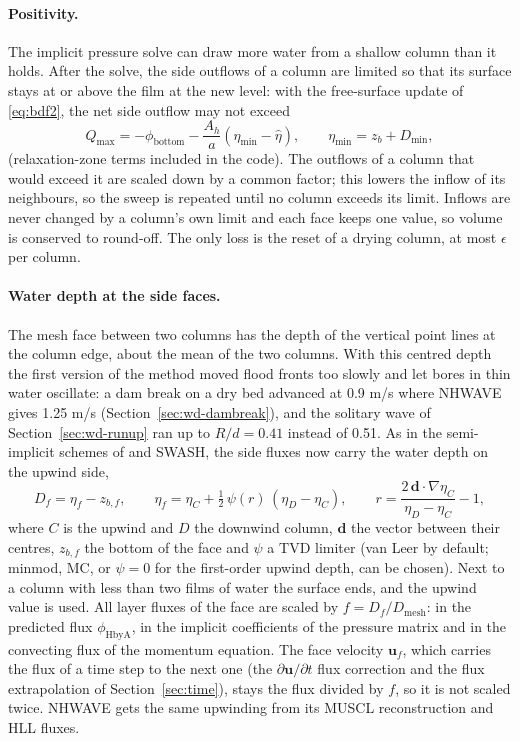 \paragraph{Positivity.} The implicit pressure solve can draw more water from
a shallow column than it holds. After the solve, the side outflows of a column
are limited so that its surface stays at or above the film at the new level:
with the free-surface update of \eqref{eq:bdf2}, the net side outflow may not
exceed
\begin{equation}
  Q_{\max} = -\phi_{\mathrm{bottom}} - \frac{A_h}{a}\left(\eta_{\min} - \hat\eta\right),
  \qquad \eta_{\min} = z_b + D_{\min},
\end{equation}
(relaxation-zone terms included in the code). The outflows of a column that
would exceed it are scaled down by a common factor; this lowers the inflow of
its neighbours, so the sweep is repeated until no column exceeds its limit.
Inflows are never changed by a column's own limit and each face keeps one
value, so volume is conserved to round-off. The only loss is the reset of a
drying column, at most $\epsilon$ per column.

\paragraph{Water depth at the side faces.} The mesh face between two columns
has the depth of the vertical point lines at the column edge, about the mean
of the two columns. With this centred depth the first version of the method
moved flood fronts too slowly and let bores in thin water oscillate: a dam
break on a dry bed advanced at 0.9 m/s where NHWAVE gives 1.25 m/s
(Section~\ref{sec:wd-dambreak}), and the solitary wave of
Section~\ref{sec:wd-runup} ran up to $R/d = 0.41$ instead of 0.51. As in the
semi-implicit schemes of \citet{stelling2003b} and SWASH, the side fluxes now
carry the water depth on the upwind side,
\begin{equation}
  D_f = \eta_f - z_{b,f},\qquad
  \eta_f = \eta_C + \tfrac12\,\psi(r)\,(\eta_D - \eta_C),\qquad
  r = \frac{2\,\bm{d}\cdot\nabla\eta_C}{\eta_D - \eta_C} - 1,
  \label{eq:facedepth}
\end{equation}
where $C$ is the upwind and $D$ the downwind column, $\bm{d}$ the vector
between their centres, $z_{b,f}$ the bottom of the face and $\psi$ a TVD
limiter (van Leer by default; minmod, MC, or $\psi=0$ for the first-order
upwind depth, can be chosen). Next to a column with less than two films of
water the surface ends, and the upwind value is used. All layer fluxes of the
face are scaled by $f = D_f/D_{\mathrm{mesh}}$: in the predicted flux
$\phi_{\mathrm{HbyA}}$, in the implicit coefficients of the pressure matrix and
in the convecting flux of the momentum equation. The face velocity
$\bm{u}_f$, which carries the flux of a time step to the next one (the
$\partial\bm{u}/\partial t$ flux correction and the flux extrapolation of
Section~\ref{sec:time}), stays the flux divided by $f$, so it is not scaled
twice. NHWAVE gets the same upwinding from its MUSCL reconstruction and HLL
fluxes.

